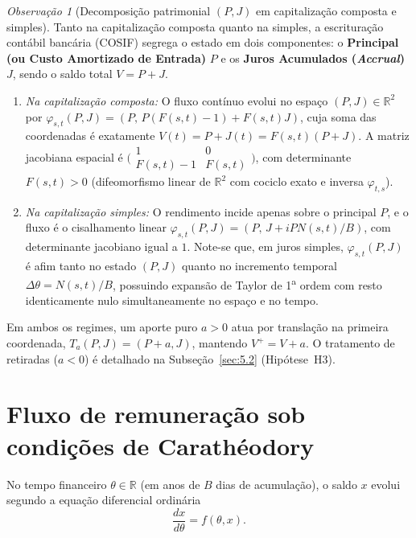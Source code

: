 \documentclass[11pt, a4paper]{article}
\theoremstyle{definition}
\theoremstyle{plain}
\theoremstyle{remark}
\newtheorem{observacao}[definicao]{Observação}
\begin{document}
\begin{observacao}[Decomposição patrimonial $(P, J)$ em capitalização composta e simples]\label{obs:2.8}
Tanto na capitalização composta quanto na simples, a escrituração contábil bancária (COSIF) segrega o estado em dois componentes: o \textbf{Principal (ou Custo Amortizado de Entrada)} $P$ e os \textbf{Juros Acumulados (\emph{Accrual})} $J$, sendo o saldo total $V = P + J$.
\begin{enumerate}[label=(\alph*)]
    \item \emph{Na capitalização composta:} O fluxo contínuo evolui no espaço $(P, J) \in \mathbb{R}^2$ por $\varphi_{s,t}(P, J) = (P,\, P(F(s,t)-1) + F(s,t)J)$, cuja soma das coordenadas é exatamente $V(t) = P + J(t) = F(s,t)(P + J)$. A matriz jacobiana espacial é $\Big(\begin{smallmatrix} 1 & 0 \\ F(s,t)-1 & F(s,t) \end{smallmatrix}\Big)$, com determinante $F(s,t) > 0$ (difeomorfismo linear de $\mathbb{R}^2$ com cociclo exato e inversa $\varphi_{t,s}$).
    \item \emph{Na capitalização simples:} O rendimento incide apenas sobre o principal $P$, e o fluxo é o cisalhamento linear $\varphi_{s,t}(P, J) = (P,\, J + i P N(s,t)/B)$, com determinante jacobiano igual a $1$. Note-se que, em juros simples, $\varphi_{s,t}(P, J)$ é afim tanto no estado $(P, J)$ quanto no incremento temporal $\Delta\theta = N(s,t)/B$, possuindo expansão de Taylor de 1\textsuperscript{a} ordem com resto identicamente nulo simultaneamente no espaço e no tempo.
\end{enumerate}
Em ambos os regimes, um aporte puro $a > 0$ atua por translação na primeira coordenada, $T_a(P, J) = (P + a, J)$, mantendo $V^+ = V + a$. O tratamento de retiradas ($a < 0$) é detalhado na Subseção~\ref{sec:5.2} (Hipótese~H3).
\end{observacao}

\section{Fluxo de remuneração sob condições de Carathéodory}\label{sec:3}

No tempo financeiro $\theta \in \mathbb{R}$ (em anos de $B$ dias de acumulação), o saldo $x$ evolui segundo a equação diferencial ordinária
\begin{equation}\label{eq:edo}
\frac{dx}{d\theta} = f(\theta, x).
\end{equation}
\end{document}

